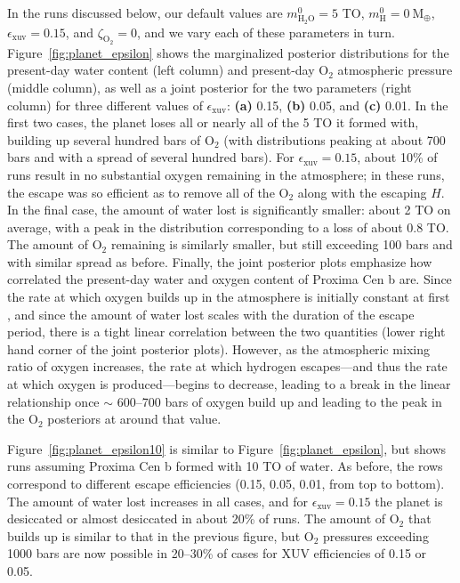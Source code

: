\documentclass[preprint,12pt]{aastex}
\begin{document}
In the runs discussed below, our default values are $m_\mathrm{H_2O}^0 = 5$ TO, $m_\mathrm{H}^0 = 0\ \mathrm{M_\oplus}$,
$\epsilon_\mathrm{xuv} = 0.15$, and $\zeta_\mathrm{O_2} = 0$, and we vary each of these parameters in turn. 
Figure~\ref{fig:planet_epsilon} shows the marginalized posterior distributions for the present-day water content (left column)
and present-day O$_2$ atmospheric pressure (middle column), as well as a joint posterior for the two parameters (right column)
for three different values of $\epsilon_\mathrm{xuv}$: \textbf{(a)} 0.15, \textbf{(b)} 0.05, and \textbf{(c)} 0.01. In the first
two cases, the planet loses all or nearly all of the 5 TO it formed with, building up several hundred bars of O$_2$ (with
distributions peaking at about 700 bars and with a spread of several hundred bars). For $\epsilon_\mathrm{xuv} = 0.15$, about
10\% of runs result in no substantial oxygen remaining in the atmosphere; in these runs, the escape was so efficient as to
remove all of the O$_2$ along with the escaping $H$. In the final case, the amount of water lost is significantly smaller:
about 2 TO on average, with a peak in the distribution corresponding to a loss of about 0.8 TO. The amount of O$_2$
remaining is similarly smaller, but still exceeding 100 bars and with similar spread as before. Finally, the joint posterior
plots emphasize how correlated the present-day water and oxygen content of Proxima Cen b are. Since the rate at which
oxygen builds up in the atmosphere is initially constant at first \citep{LugerBarnes15}, and since the amount of water
lost scales with the duration of the escape period, there is a tight linear correlation between the two quantities
(lower right hand corner of the joint posterior plots). However, as the atmospheric mixing ratio of oxygen increases,
the rate at which hydrogen escapes---and thus the rate at which oxygen is produced---begins to decrease, leading to a break
in the linear relationship once $\sim$ 600--700 bars of oxygen build up and leading to the peak in the O$_2$ posteriors
at around that value.

Figure~\ref{fig:planet_epsilon10} is similar to Figure~\ref{fig:planet_epsilon}, but shows runs assuming Proxima Cen b
formed with 10 TO of water. As before, the rows correspond to different escape efficiencies (0.15, 0.05, 0.01, from top
to bottom). The amount of water lost increases in all cases, and for $\epsilon_\mathrm{xuv} = 0.15$ the planet is
desiccated or almost desiccated in about 20\% of runs. The amount of O$_2$ that builds up is similar to that in the
previous figure, but O$_2$ pressures exceeding 1000 bars are now possible in 20--30\% of cases for XUV efficiencies of 0.15
or 0.05.
\end{document}
